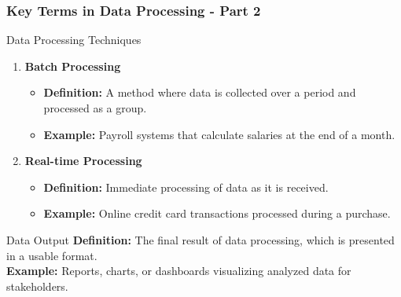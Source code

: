 \documentclass[aspectratio=169]{beamer}
\begin{document}
\begin{frame}[fragile]
    \frametitle{Key Terms in Data Processing - Part 2}
    \begin{block}{Data Processing Techniques}
        \begin{enumerate}
            \item \textbf{Batch Processing}
                \begin{itemize}
                    \item \textbf{Definition:} A method where data is collected over a period and processed as a group.
                    \item \textbf{Example:} Payroll systems that calculate salaries at the end of a month.
                \end{itemize}
            \item \textbf{Real-time Processing}
                \begin{itemize}
                    \item \textbf{Definition:} Immediate processing of data as it is received.
                    \item \textbf{Example:} Online credit card transactions processed during a purchase.
                \end{itemize}
        \end{enumerate}
    \end{block}

    \begin{block}{Data Output}
        \textbf{Definition:} The final result of data processing, which is presented in a usable format.\\
        \textbf{Example:} Reports, charts, or dashboards visualizing analyzed data for stakeholders.
    \end{block}
\end{frame}
\end{document}
